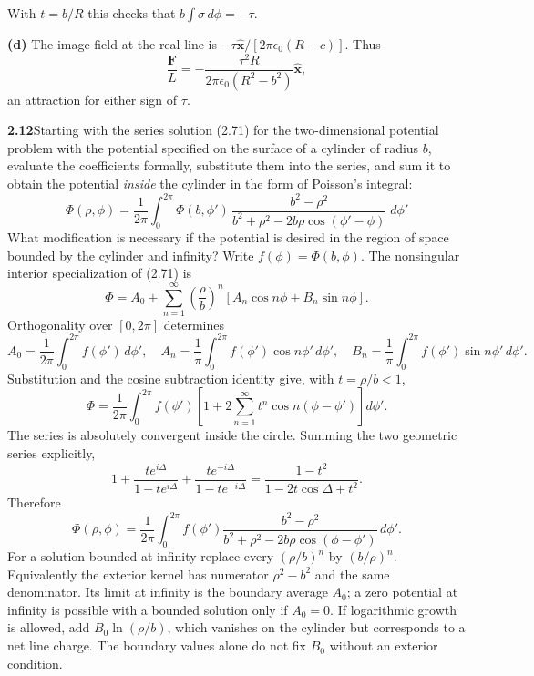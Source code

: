 With $t=b/R$ this checks that $b\int\sigma\,d\phi=-\tau$.
\begin{center}
\end{center}
\textbf{(d)} The image field at the real line is
$-\tau\widehat{\mathbf x}/[2\pi\epsilon _0(R-c)]$. Thus
\[
\boxed{\frac{\mathbf F}{L}
=-\frac{\tau^2R}{2\pi\epsilon _0(R^2-b^2)}\widehat{\mathbf x},}
\]
an attraction for either sign of $\tau$.

\par\bigskip
\noindent\textbf{2.12}\quad Starting with the series solution (2.71) for the two-dimensional potential problem with the potential specified on the surface of a cylinder of radius $b$, evaluate the coefficients formally, substitute them into the series, and sum it to obtain the potential \emph{inside} the cylinder in the form of Poisson's integral:
\[
\Phi(\rho,\phi)=\frac{1}{2\pi}\int_{0}^{2\pi}\Phi(b,\phi')\,\frac{b^{2}-\rho^{2}}{b^{2}+\rho^{2}-2b\rho\cos(\phi'-\phi)}\;d\phi'
\]
What modification is necessary if the potential is desired in the region of space bounded by the cylinder and infinity?
\solution
Write $f(\phi)=\Phi(b,\phi)$. The nonsingular interior specialization
of (2.71) is
\[
\Phi=A_0+\sum_{n=1}^\infty\left(\frac\rho b\right)^n
 [A_n\cos n\phi+B_n\sin n\phi].
\]
Orthogonality over $[0,2\pi]$ determines
\[
A_0=\frac1{2\pi}\int_0^{2\pi}f(\phi')\,d\phi',\quad
A_n=\frac1\pi\int_0^{2\pi}f(\phi')\cos n\phi'\,d\phi',\quad
B_n=\frac1\pi\int_0^{2\pi}f(\phi')\sin n\phi'\,d\phi'.
\]
Substitution and the cosine subtraction identity give, with $t=\rho/b<1$,
\[
\Phi=\frac1{2\pi}\int_0^{2\pi}f(\phi')
 \left[1+2\sum_{n=1}^\infty t^n\cos n(\phi-\phi')\right]d\phi'.
\]
The series is absolutely convergent inside the circle. Summing the
two geometric series explicitly,
\[
1+\frac{te^{i\Delta}}{1-te^{i\Delta}}
  +\frac{te^{-i\Delta}}{1-te^{-i\Delta}}
=\frac{1-t^2}{1-2t\cos\Delta+t^2}.
\]
Therefore
\[
\boxed{\Phi(\rho,\phi)=\frac1{2\pi}\int_0^{2\pi}f(\phi')
 \frac{b^2-\rho^2}{b^2+\rho^2-2b\rho\cos(\phi-\phi')}\,d\phi'.}
\]
For a solution bounded at infinity replace every $(\rho/b)^n$ by
$(b/\rho)^n$. Equivalently the exterior kernel has numerator
$\rho^2-b^2$ and the same denominator. Its limit at infinity is the
boundary average $A_0$; a zero potential at infinity is possible
with a bounded solution only if $A_0=0$. If logarithmic growth is
allowed, add $B_0\ln(\rho/b)$, which vanishes on the cylinder but
corresponds to a net line charge. The boundary values alone do not
fix $B_0$ without an exterior condition.

